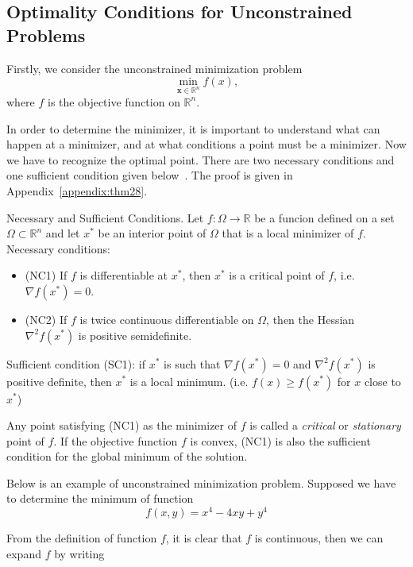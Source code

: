 \subsection{Optimality Conditions for Unconstrained Problems}
Firstly, we consider the unconstrained minimization problem
\begin{equation}
    \min _{\mathbf{x} \in \mathbb{R}^{n}} f(x),
\end{equation}
where $f$ is the objective function on $\mathbb{R}^n$. 
\par In order to determine the minimizer, it is important to understand what can happen at a minimizer, and at what conditions a point must be a minimizer. Now we have to recognize the optimal point. There are two necessary conditions and one sufficient condition given below~\citep{JS:06}. The proof is given in Appendix~\ref{appendix:thm28}.
\begin{thm}{Necessary and Sufficient Conditions.}
    \label{thm28}
    Let $f:\Omega \rightarrow \mathbb{R}$ be a funcion defined on a set $\Omega \subset \mathbb{R}^n$ and let $x^*$ be an interior point of $\Omega$ that is a local minimizer of $f$. \\
    Necessary conditions:
    \begin{itemize}
        \item (NC1) If $f$ is differentiable at $x^*$, then $x^*$ is a critical point of $f$, i.e. $\nabla f\left(x^{*}\right)=0$.
        \item (NC2) If $f$ is twice continuous differentiable on $\Omega$, then the Hessian $\nabla^2 f\left(x^{*}\right)$ is positive semidefinite.
    \end{itemize}
    Sufficient condition (SC1): if $x^*$ is such that $\nabla f\left(x^{*}\right)=0$ and $\nabla^2 f\left(x^{*}\right)$ is positive definite, then $x^*$ is a local minimum. (i.e. $f(x) \geq f(x^*)$ for $x$ close to $x^*$)
\end{thm}
\par Any point satisfying (NC1) as the minimizer of $f$ is called a \emph{critical} or \emph{stationary} point of $f$. If the objective function $f$ is convex, (NC1) is also the sufficient condition for the global minimum of the solution. 
\par Below is an example of unconstrained minimization problem. Supposed we have to determine the minimum of function
$$
f(x, y)=x^{4}-4 x y+y^{4}
$$
\par From the definition of function $f$, it is clear that $f$ is continuous, then we can expand $f$ by writing
